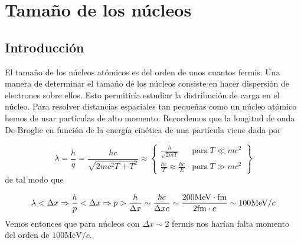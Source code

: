 \section{Tamaño de los núcleos}

\subsection{Introducción}

El tamaño de los núcleos atómicos es del orden de unos cuantos fermis. Una manera de determinar el tamaño de los núcleos consiste en hacer dispersión de electrones sobre ellos. Esto permitiría estudiar la distribución de carga en el núcleo. Para resolver distancias espaciales tan pequeñas como un núcleo atómico hemos de usar partículas de alto momento. Recordemos que la longitud de onda De-Broglie en función de la energía cinética de una partícula viene dada por

\begin{equation}
	\lambda = \frac{h}{q} = \frac{hc}{\sqrt{2mc^2T+T^2}} \approx \left\{  \begin{array}{ll}
		\frac{h}{\sqrt{2mT}} & \text{para} \ T \ll mc^2 \\
		\frac{hc}{T} \approx \frac{hc}{E} & \text{para} \ T \gg mc^2
	\end{array} \right\}
\end{equation} 
de tal modo que 

\begin{equation}
	\lambda < \Delta x \Rightarrow \frac{h}{p} < \Delta x  \Rightarrow p > \frac{h}{\Delta x} \sim \frac{\hbar c}{\Delta x c} \sim \frac{200 \unit{\MeV \cdot \fm}}{2 \unit{\fm} \cdot c} \sim 100 \unit{\MeV} /c
\end{equation}
Vemos entonces que para núcleos con $\Delta x \sim 2 $ fermis nos harían falta momento del orden de $100 \unit{\MeV}/c$. 

